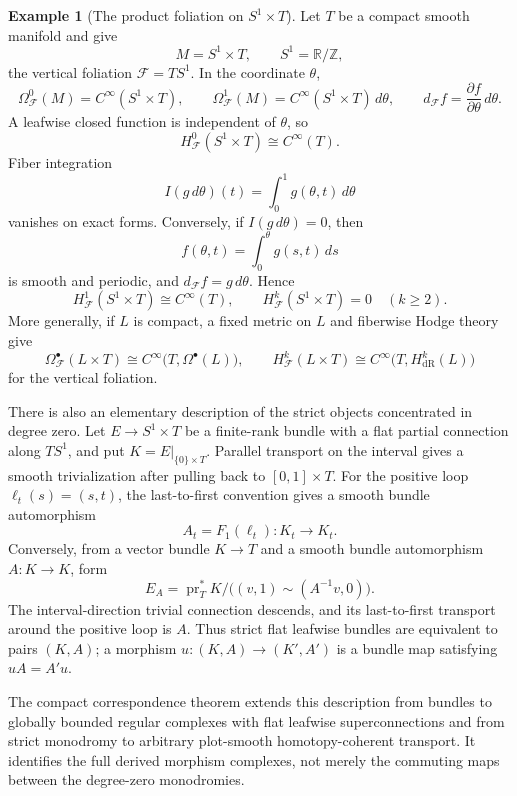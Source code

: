 \documentclass[12pt]{amsart}
\theoremstyle{definition}
\newtheorem{example}[thm]{Example}
\theoremstyle{remark}
\numberwithin{equation}{section}
\newcommand{\CF}{{\mathcal F}}
\newcommand{\Z}{{\mathbb{Z}}}
\newcommand{\R}{{\mathbb{R}}}
\newcommand{\1}{{\mathbb{1}}}
\begin{document}
\begin{example}[The product foliation on $S^1\times T$]
\label{ex:product-circle}
Let $T$ be a compact smooth manifold and give
\[
 M=S^1\times T,\qquad S^1=\R/\Z,
\]
the vertical foliation $\CF=TS^1$.  In the coordinate $\theta$,
\[
 \Omega^0_{\CF}(M)=C^\infty(S^1\times T),\qquad
 \Omega^1_{\CF}(M)=C^\infty(S^1\times T)\,d\theta,
 \qquad
 d_{\CF}f=\frac{\partial f}{\partial\theta}\,d\theta.
\]
A leafwise closed function is independent of $\theta$, so
\[
 H^0_{\CF}(S^1\times T)\cong C^\infty(T).
\]
Fiber integration
\[
 I(g\,d\theta)(t)=\int_0^1g(\theta,t)\,d\theta
\]
vanishes on exact forms.  Conversely, if $I(g\,d\theta)=0$, then
\[
 f(\theta,t)=\int_0^\theta g(s,t)\,ds
\]
is smooth and periodic, and $d_{\CF}f=g\,d\theta$.  Hence
\[
 H^1_{\CF}(S^1\times T)\cong C^\infty(T),
 \qquad
 H^k_{\CF}(S^1\times T)=0\quad(k\geq2).
\]
More generally, if $L$ is compact, a fixed metric on $L$ and
fiberwise Hodge theory give
\[
 \Omega^\bullet_{\CF}(L\times T)
 \cong C^\infty\bigl(T,\Omega^\bullet(L)\bigr),
 \qquad
 H^k_{\CF}(L\times T)
 \cong C^\infty\bigl(T,H^k_{\mathrm{dR}}(L)\bigr)
\]
for the vertical foliation.

There is also an elementary description of the strict objects
concentrated in degree zero.  Let $E\to S^1\times T$ be a
finite-rank bundle with a flat partial connection along $TS^1$, and
put $K=E|_{\{0\}\times T}$.  Parallel transport on the interval gives
a smooth trivialization after pulling back to $[0,1]\times T$.  For
the positive loop $\ell_t(s)=(s,t)$, the last-to-first convention
gives a smooth bundle automorphism
\[
 A_t=F_1(\ell_t):K_t\longrightarrow K_t.
\]
Conversely, from a vector bundle $K\to T$ and a smooth bundle
automorphism $A:K\to K$, form
\[
 E_A=
 \operatorname{pr}_T^*K
 \big/
 \bigl((v,1)\sim(A^{-1}v,0)\bigr).
\]
The interval-direction trivial connection descends, and its
last-to-first transport around the positive loop is $A$.  Thus strict
flat leafwise bundles are equivalent to pairs $(K,A)$; a morphism
$u:(K,A)\to(K',A')$ is a bundle map satisfying $uA=A'u$.

The compact correspondence theorem extends this description from bundles to
globally bounded regular complexes with flat leafwise
superconnections and from strict monodromy to arbitrary plot-smooth
homotopy-coherent transport.  It identifies the full derived
morphism complexes, not merely the commuting maps between the
degree-zero monodromies.
\end{example}
\end{document}
